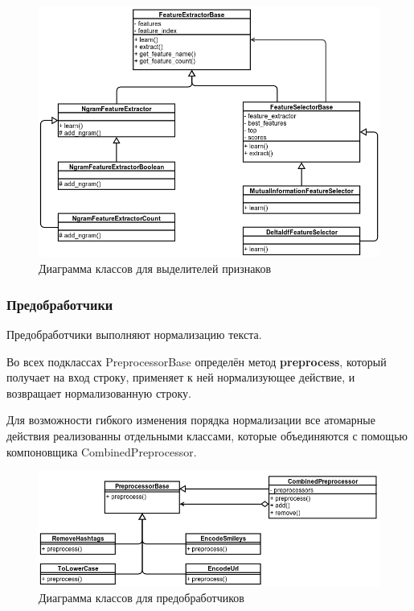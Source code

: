 \begin{figure}[!h]
\begin{center}
\includegraphics[scale=0.6, clip]{../resources/uml/feature_extractors_classes.png}
\caption{Диаграмма классов для выделителей признаков}
\label{gr:extractors}
\end{center}
\end{figure}

\clearpage{}

\subsubsection{Предобработчики}

Предобработчики выполняют нормализацию текста.

Во всех подклассах PreprocessorBase определён метод {\bf preprocess}, который получает на вход строку, применяет
к ней нормализующее действие, и возвращает нормализованную строку.

Для возможности гибкого изменения порядка нормализации
все атомарные действия реализованны отдельными классами,
которые объединяются с помощью компоновщика
CombinedPreprocessor.

\begin{figure}[!h]
\begin{center}
\includegraphics[scale=0.6, clip]{../resources/uml/preprocessor_classes.png}
\caption{Диаграмма классов для предобработчиков}
\label{gr:preprocessors}
\end{center}
\end{figure} 

